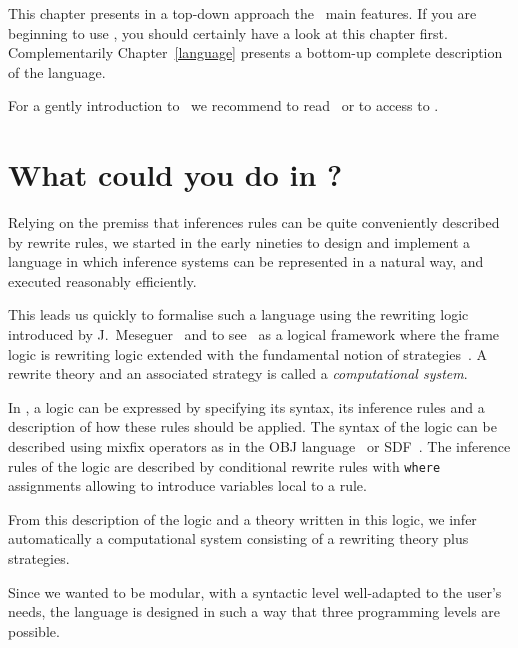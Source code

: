 

This chapter presents in a top-down approach the \elan\ main
features. If you are beginning to use \elan, you should
certainly have a look at this chapter first. Complementarily
Chapter~\ref{language} presents a bottom-up complete
description of the language.

For a gently introduction to \elan\ we recommend to
read~\cite{BorovanskyKKMR-WRLA98} or to access to 
\localisationWebElan{}.

\section{What could you do in \elan?}

Relying on the premiss that inferences rules can be quite conveniently
described by rewrite rules, we started in the early nineties to design
and implement a language in which inference systems can be represented
in a natural way, and executed reasonably efficiently.

This leads us quickly to formalise such a language using the rewriting
logic introduced by J.~Meseguer~\cite{MeseguerTCS92} and to see \elan\
as a logical framework where the frame logic is rewriting logic
extended with the fundamental notion of
strategies~\cite{VittekThese,KirchnerKV-MIT95}.  A rewrite theory and
an associated strategy is called a {\em computational system}.

In \elan, a logic can be expressed by specifying its syntax, its
inference rules and a description of how these rules should be
applied. The syntax of the logic can be described using mixfix
operators as in the OBJ language~\cite{obj3-88} or
SDF~\cite{HeeringHendriksKlintRekers89}.  The inference rules of the
logic are described by conditional rewrite rules with \texttt{where}
assignments allowing to introduce variables local to a rule.

From this description of the logic and a theory written in this logic,
we infer   automatically  a  computational   system  consisting of   a
rewriting theory plus strategies.

Since we wanted \elan{} to be modular, with a syntactic level
well-adapted to the user's needs, the language is designed in such a way
that three programming levels are possible.

